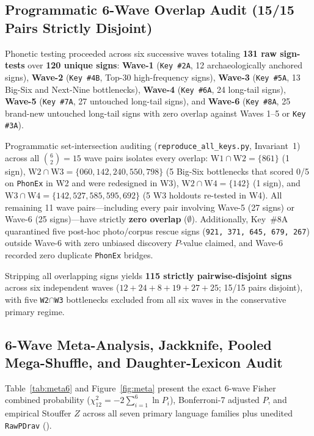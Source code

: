 \documentclass[11pt,a4paper]{article}
\begin{document}
\subsection{Programmatic 6-Wave Overlap Audit (15/15 Pairs Strictly Disjoint)}

Phonetic testing proceeded across six successive waves totaling \textbf{131 raw sign-tests} over \textbf{120 unique signs}: \textbf{Wave-1} (\texttt{Key \#2A}, 12 archaeologically anchored signs), \textbf{Wave-2} (\texttt{Key \#4B}, Top-30 high-frequency signs), \textbf{Wave-3} (\texttt{Key \#5A}, 13 Big-Six and Next-Nine bottlenecks), \textbf{Wave-4} (\texttt{Key \#6A}, 24 long-tail signs), \textbf{Wave-5} (\texttt{Key \#7A}, 27 untouched long-tail signs), and \textbf{Wave-6} (\texttt{Key \#8A}, 25 brand-new untouched long-tail signs with zero overlap against Waves 1--5 or \texttt{Key \#3A}).

Programmatic set-intersection auditing (\texttt{reproduce\_all\_keys.py}, Invariant~1) across all $\binom{6}{2} = 15$ wave pairs isolates every overlap: $\text{W1} \cap \text{W2} = \{861\}$ (1 sign), $\text{W2} \cap \text{W3} = \{060, 142, 240, 550, 798\}$ (5 Big-Six bottlenecks that scored 0/5 on \texttt{PhonEx} in W2 and were redesigned in W3), $\text{W2} \cap \text{W4} = \{142\}$ (1 sign), and $\text{W3} \cap \text{W4} = \{142, 527, 585, 595, 692\}$ (5 W3 holdouts re-tested in W4). All remaining 11 wave pairs—including every pair involving Wave-5 (27 signs) or Wave-6 (25 signs)—have strictly \textbf{zero overlap} ($\emptyset$). Additionally, Key~\#8A quarantined five post-hoc photo/corpus rescue signs (\texttt{921, 371, 645, 679, 267}) outside Wave-6 with zero unbiased discovery $P$-value claimed, and Wave-6 recorded zero duplicate \texttt{PhonEx} bridges.

Stripping all overlapping signs yields \textbf{115 strictly pairwise-disjoint signs} across six independent waves ($12 + 24 + 8 + 19 + 27 + 25$; 15/15 pairs disjoint), with five \texttt{W2}$\cap$\texttt{W3} bottlenecks excluded from all six waves in the conservative primary regime.

\subsection{6-Wave Meta-Analysis, Jackknife, Pooled Mega-Shuffle, and Daughter-Lexicon Audit}

Table~\ref{tab:meta6} and Figure~\ref{fig:meta} present the exact 6-wave Fisher combined probability \citep{fisher1932} ($\chi^2_{12} = -2\sum_{i=1}^6 \ln P_i$), Bonferroni-7 adjusted $P$, and empirical Stouffer $Z$ across all seven primary language families plus unedited \texttt{RawPDrav} ().
\end{document}
